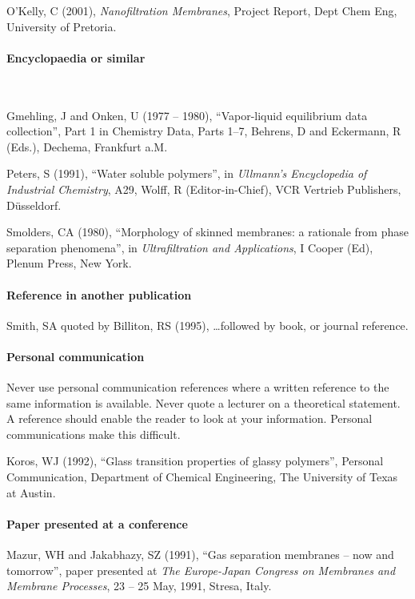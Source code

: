 \documentclass[a5paper, 10pt]{article}
\begin{document}
O'Kelly, C (2001), \textit{Nanofiltration Membranes}, Project
  Report, Dept Chem Eng, University of Pretoria.

\paragraph{Encyclopaedia or similar}
~

Gmehling, J and Onken, U (1977 -- 1980), ``Vapor-liquid
  equilibrium data collection'', Part 1 in Chemistry Data, Parts 1--7,
  Behrens, D and Eckermann, R (Eds.), Dechema, Frankfurt a.M.

Peters, S (1991), ``Water soluble polymers'', in
  \textit{Ullmann's Encyclopedia of Industrial Chemistry}, A29, Wolff,
  R (Editor-in-Chief), VCR Vertrieb Publishers, D\"usseldorf.

Smolders, CA (1980), ``Morphology of skinned membranes: a
  rationale from phase separation phenomena'', in
  \textit{Ultrafiltration and Applications}, I Cooper (Ed), Plenum
  Press, New York.

\paragraph{Reference in another publication}

Smith, SA quoted by Billiton, RS (1995), \dots followed by
  book, or journal reference.


\paragraph{Personal communication}
Never use personal communication references where a written reference
to the same information is available.  Never quote a lecturer on a
theoretical statement.  A reference should enable the reader to look
at your information.  Personal communications make this difficult.

Koros, WJ (1992), ``Glass transition properties of glassy
  polymers'', Personal Communication, Department of Chemical
  Engineering, The University of Texas at Austin.

\paragraph{Paper presented at a conference}

Mazur, WH and Jakabhazy, SZ (1991), ``Gas separation membranes
  -- now and tomorrow'', paper presented at \textit{The Europe-Japan
    Congress on Membranes and Membrane Processes}, 23 -- 25 May, 1991,
  Stresa, Italy.
\end{document}
